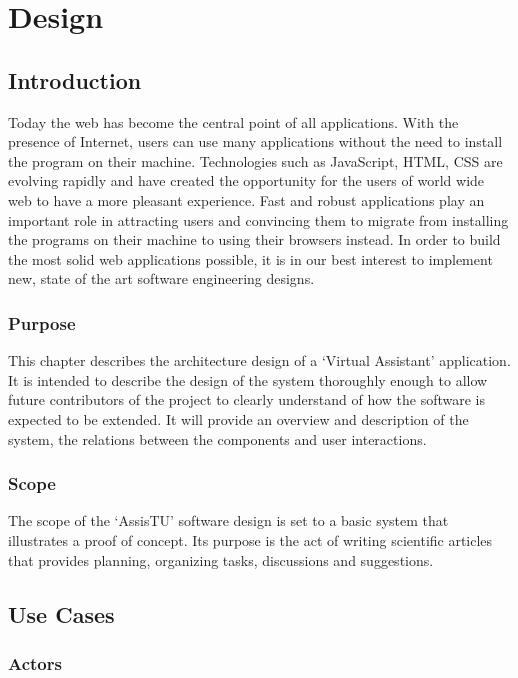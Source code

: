 \chapter{Design}

\section{Introduction} %
\label{sec:introduction}

Today the web has become the central point of all applications. With the presence of Internet, users can use many applications without the need to 
install the program on their machine. Technologies such as JavaScript, HTML, CSS are evolving rapidly and have created the opportunity for the users of 
world wide web to have a more pleasant experience. Fast and robust applications play an important role in attracting users and convincing them to 
migrate from installing the programs on their machine to using their browsers instead. In order to build the most solid web applications possible, 
it is in our best interest to implement new, state of the art software engineering designs.

\subsection{Purpose} %
\label{sub:purpose}

This chapter describes the architecture design of a `Virtual Assistant' application. It is intended to describe the design of the system 
thoroughly enough to allow future contributors of the project to clearly understand of how the software is expected to be extended. It will provide 
an overview and description of the system, the relations between the components and user interactions. 

\subsection{Scope} %
\label{sub:scope}
The scope of the `AssisTU' software design is set to a basic system that illustrates a proof of concept. Its purpose is the act of writing 
scientific articles that provides planning, organizing tasks, discussions and suggestions.

\section{Use Cases} %
\label{sec:system_overview}
\subsection{Actors} %
\label{sub:actors}
